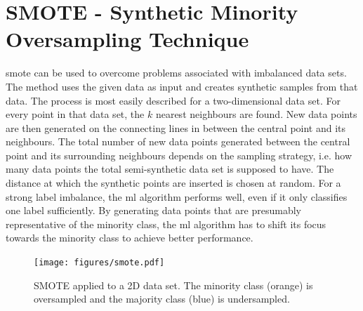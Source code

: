 \section{SMOTE - Synthetic Minority Oversampling Technique}\label{sec:smote}
\ac{smote} can be used to overcome problems associated with imbalanced data sets. The method uses the given data as input and creates synthetic samples from that data. The process is most easily described for a two-dimensional data set. For every point in that data set, the $k$ nearest neighbours are found. New data points are then generated on the connecting lines in between the central point and its neighbours. The total number of new data points generated between the central point and its surrounding neighbours depends on the sampling strategy, i.e. how many data points the total semi-synthetic data set is supposed to have. The distance at which the synthetic points are inserted is chosen at random.\cite{Chawla2002} For a strong label imbalance, the \ac{ml} algorithm performs well, even if it only classifies one label sufficiently. By generating data points that are presumably representative of the minority class, the \ac{ml} algorithm has to shift its focus towards the minority class to achieve better performance.
\begin{figure}[H]
	\centering
	\texttt{[image: figures/smote.pdf]}
	\caption[SMOTE Applied to a 2D Data Set]{SMOTE applied to a 2D data set. The minority class (orange) is oversampled and the majority class (blue) is undersampled.}
	\label{fig:smoteexample}
\end{figure}\noindent
%
%
